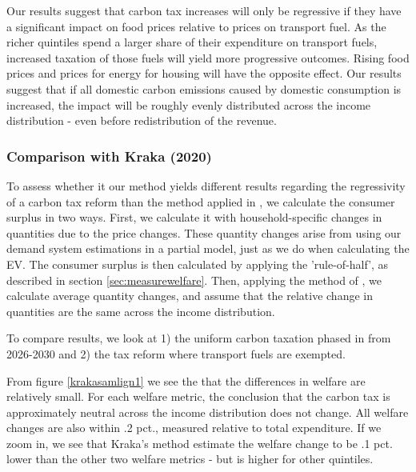 Our results suggest that carbon tax increases will only be regressive if they have a significant impact on food prices relative to prices on transport fuel. As the richer quintiles spend a larger share of their expenditure on transport fuels, increased taxation of those fuels will yield more progressive outcomes. Rising food prices and prices for energy for housing will have the opposite effect. Our results suggest that if all domestic carbon emissions caused by domestic consumption is increased, the impact will be roughly evenly distributed across the income distribution - even before redistribution of the revenue.

\subsubsection{Comparison with Kraka (2020)}\label{sec:krakacompare}
To assess whether it our method yields different results regarding the regressivity of a carbon tax reform than the method applied in \cite{Kraka2020}, we calculate the consumer surplus in two ways. First, we calculate it with household-specific changes in quantities due to the price changes. These quantity changes arise from using our demand system estimations in a partial model, just as we do when calculating the EV. The consumer surplus is then calculated by applying the 'rule-of-half', as described in section \ref{sec:measurewelfare}. Then, applying the method of \cite{Kraka2020}, we calculate average quantity changes, and assume that the relative change in quantities are the same across the income distribution.

To compare results, we look at 1) the uniform carbon taxation phased in from 2026-2030 and 2) the tax reform where transport fuels are exempted.

From figure \ref{krakasamlign1} we see the that the differences in welfare are relatively small. For each welfare metric, the conclusion that the carbon tax is approximately neutral across the income distribution does not change. All welfare changes are also within .2 pct., measured relative to total expenditure. If we zoom in, we see that Kraka's method estimate the welfare change to be .1 pct. lower than the other two welfare metrics - but is higher for other quintiles.

